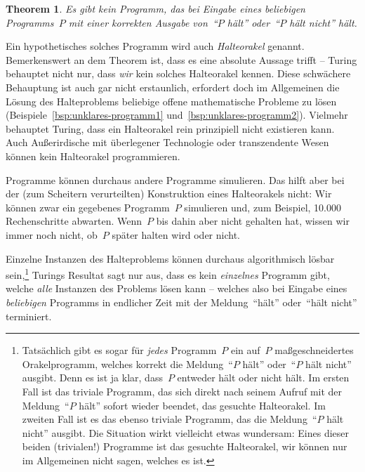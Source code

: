 \documentclass[twoside]{../zirkelblatt1415}
\theoremstyle{definition}
\theoremstyle{plain}
\newtheorem{thm}[defn]{Theorem}
\theoremstyle{remark}
\begin{document}
\begin{thm}Es gibt kein Programm, das bei Eingabe eines beliebigen Programms~$P$ mit einer
korrekten Ausgabe von~"`$P$ hält"' oder~"`$P$ hält nicht"' hält.\end{thm}

Ein hypothetisches solches Programm wird auch \emph{Halteorakel} genannt.
Bemerkenswert an dem Theorem ist, dass es eine absolute Aussage trifft --
Turing behauptet nicht nur, dass \emph{wir} kein solches Halteorakel kennen.
Diese schwächere Behauptung ist auch gar nicht erstaunlich, erfordert doch im
Allgemeinen die Lösung des Halteproblems beliebige offene mathematische
Probleme zu lösen (Beispiele~\ref{bsp:unklares-programm1} und~\ref{bsp:unklares-programm2}).
Vielmehr behauptet Turing, dass ein Halteorakel rein prinzipiell nicht
existieren kann. Auch Außerirdische mit überlegener Technologie oder
transzendente Wesen können kein Halteorakel programmieren.

Programme können durchaus andere Programme simulieren. Das hilft
aber bei der (zum Scheitern verurteilten) Konstruktion eines Halteorakels
nicht: Wir können zwar ein gegebenes Programm~$P$ simulieren und, zum Beispiel,
10.000 Rechenschritte abwarten. Wenn~$P$ bis dahin aber nicht gehalten hat,
wissen wir immer noch nicht, ob~$P$ später halten wird oder nicht.

Einzelne Instanzen des Halteproblems können durchaus algorithmisch
lösbar sein,\footnote{Tatsächlich gibt es sogar für \emph{jedes} Programm~$P$
ein auf~$P$ maßgeschneidertes Orakelprogramm, welches korrekt die Meldung~"`$P$
hält"' oder~"`$P$ hält nicht"' ausgibt. Denn es ist ja klar, dass~$P$ entweder
hält oder nicht hält.  Im ersten Fall ist das triviale Programm, das sich
direkt nach seinem Aufruf mit der Meldung~"`$P$ hält"' sofort wieder beendet,
das gesuchte Halteorakel. Im zweiten Fall ist es das ebenso triviale Programm,
das die Meldung~"`$P$ hält nicht"' ausgibt. Die Situation wirkt vielleicht
etwas wundersam: Eines dieser beiden (trivialen!) Programme ist das gesuchte
Halteorakel, wir können nur im Allgemeinen nicht sagen, welches es ist.}
Turings Resultat sagt nur aus, dass es kein \emph{einzelnes}
Programm gibt, welche \emph{alle} Instanzen des Problems lösen kann -- welches
also bei Eingabe eines \emph{beliebigen} Programms in endlicher Zeit mit der
Meldung~"`hält"' oder~"`hält nicht"' terminiert.
\end{document}

